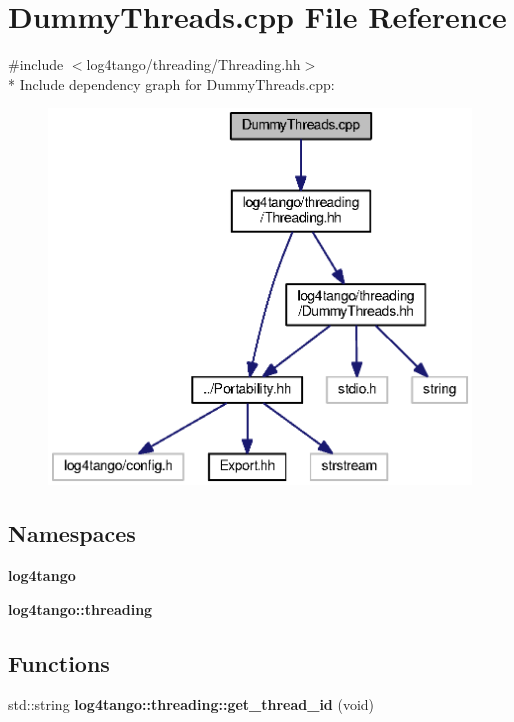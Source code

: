 \section{Dummy\-Threads.\-cpp File Reference}
\label{DummyThreads_8cpp}
{\ttfamily \#include $<$log4tango/threading/\-Threading.\-hh$>$}\\*
Include dependency graph for Dummy\-Threads.\-cpp\-:
\nopagebreak
\begin{figure}[H]
\begin{center}
\leavevmode
\includegraphics[width=345pt]{d5/d3f/DummyThreads_8cpp__incl}
\end{center}
\end{figure}
\subsection*{Namespaces}
\begin{DoxyCompactItemize}
\item 
{\bf log4tango}
\item 
{\bf log4tango\-::threading}
\end{DoxyCompactItemize}
\subsection*{Functions}
\begin{DoxyCompactItemize}
\item 
std\-::string {\bf log4tango\-::threading\-::get\-\_\-thread\-\_\-id} (void)
\end{DoxyCompactItemize}
